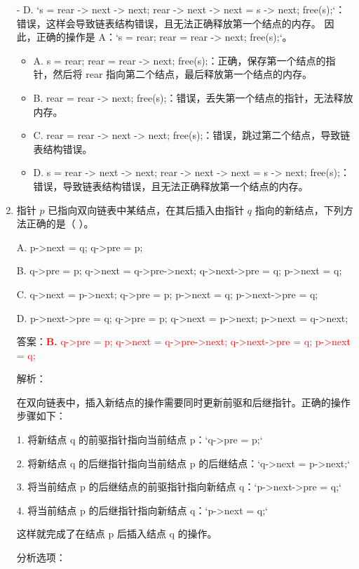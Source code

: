 \documentclass[lang=cn,newtx,10pt,scheme=chinese]{../../../elegantbook}
\begin{document}
\begin{enumerate}
        - D. `s = rear -> next -> next; rear -> next -> next = s -> next; free(s);`：错误，这样会导致链表结构错误，且无法正确释放第一个结点的内存。
        因此，正确的操作是 A：`s = rear; rear = rear -> next; free(s);`。
        \begin{itemize}
            \item A. s = rear; rear = rear -> next; free(s);：正确，保存第一个结点的指针，然后将 rear 指向第二个结点，最后释放第一个结点的内存。
            \item B. rear = rear -> next; free(s);：错误，丢失第一个结点的指针，无法释放内存。
            \item C. rear = rear -> next -> next; free(s);：错误，跳过第二个结点，导致链表结构错误。
            \item D. s = rear -> next -> next; rear -> next -> next = s -> next; free(s);：错误，导致链表结构错误，且无法正确释放第一个结点的内存。
        \end{itemize}

        \item 指针 $p$ 已指向双向链表中某结点，在其后插入由指针 $q$ 指向的新结点，下列方法正确的是（ ）。  
    
        A. p->next = q; q->pre = p;
        
        B. q->pre = p; q->next = q->pre->next; q->next->pre = q; p->next = q;
       
        C. q->next = p->next; q->pre = p; p->next = q; p->next->pre = q;
       
        D. p->next->pre = q; q->pre = p; q->next = p->next; p->next = q->next;

        答案：\textcolor{red}{\textbf{B.} q->pre = p; q->next = q->pre->next; q->next->pre = q; p->next = q;}

        解析：

        在双向链表中，插入新结点的操作需要同时更新前驱和后继指针。正确的操作步骤如下：

        1. 将新结点 q 的前驱指针指向当前结点 p：`q->pre = p;`

        2. 将新结点 q 的后继指针指向当前结点 p 的后继结点：`q->next = p->next;`

        3. 将当前结点 p 的后继结点的前驱指针指向新结点 q：`p->next->pre = q;`

        4. 将当前结点 p 的后继指针指向新结点 q：`p->next = q;`

        这样就完成了在结点 p 后插入结点 q 的操作。

        分析选项：


\end{enumerate}
\end{document}

